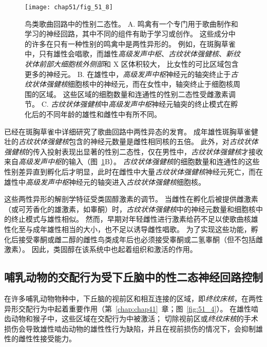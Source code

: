 \begin{figure}[htbp]
	\centering
	\texttt{[image: chap51/fig\_51\_8]}
	\caption{鸟类歌曲回路中的性别二态性。
		A. 鸣禽有一个专门用于歌曲制作和学习的神经回路，其中不同的组件有助于学习或创作。
		这些成分中的许多在只有一种性别的鸣禽中是两性异形的。
		例如，在斑胸草雀中，只有雄性会唱歌，而雄性\textit{高级发声中枢}、\textit{古纹状体强健核}、\textit{新纹状体前部大细胞核外侧部}和 X 区体积较大， 比女性的可比区域包含更多的神经元\cite{brainard2002songbirds}。
		B. 在雄性中，\textit{高级发声中枢}神经元的轴突终止于\textit{古纹状体强健核}细胞核中的神经元，而在女性中，轴突终止于细胞核周围的区域。
		这些区域的细胞数量和连通性的性别二态性受雌激素调节\cite{morris2004sexual}。
		C. \textit{古纹状体强健核}中\textit{高级发声中枢}神经元轴突的终止模式在孵化后的不同年龄的雄性和雌性中有所不同\cite{konishi1985neuronal}。 }
	\label{fig:51_8}
\end{figure}


已经在斑胸草雀中详细研究了歌曲回路中两性异态的发育。
成年雄性斑胸草雀健壮的\textit{古纹状体强健核}包含的神经元数量是雌性相同核的五倍。
此外，对\textit{古纹状体强健核}的传入投射表现出显著的性别二态性，仅在男性中，\textit{古纹状体强健核}才接收来自\textit{高级发声中枢}的输入（图~\ref{fig:51_8}B）。
\textit{古纹状体强健核}的细胞数量和连通性的这些性别差异直到孵化后才明显，此时在雌性中大量\textit{古纹状体强健核}神经元死亡，而在雄性中\textit{高级发声中枢}神经元的轴突进入\textit{古纹状体强健核}细胞核。


这些两性异形的解剖学特征受类固醇激素的调节。
当雌性在孵化后被提供雌激素（或可芳香化的雄激素，如睾酮）时，\textit{古纹状体强健核}中的神经元数量和细胞核中的终止模式与雄性相似。
然而，早期对年轻雌性进行激素给药不足以使歌曲核雄性化至与成年雄性相当的大小，也不足以诱导雌性唱歌。
为了实现这些功能，孵化后接受睾酮或雌二醇的雌性鸟类成年后也必须接受睾酮或二氢睾酮（但不包括雌激素）。
因此，类固醇在该系统中也起着组织和激活的作用。



\subsection{哺乳动物的交配行为受下丘脑中的性二态神经回路控制}

在许多哺乳动物物种中，下丘脑的视前区和相互连接的区域，即\textit{终纹床核}，在两性异形交配行为中起着重要作用（第~\ref{chap:chap41}~章；图~\ref{fig:51_4}）。
在雄性啮齿动物和猴子中，这些区域在交配行为中被激活；
切除视前区或\textit{终纹床核}的手术损伤会导致雄性啮齿动物的雄性性行为缺陷，并且在视前损伤的情况下，会抑制雄性的雌性性接受能力。


